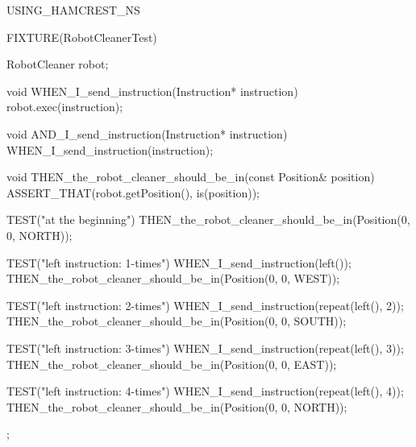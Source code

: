 \begin{content}
\begin{leftbar}
\begin{c++}[caption={test/robot-cleaner/RobotCleanerTest.cpp}]
USING_HAMCREST_NS

FIXTURE(RobotCleanerTest)
{
    RobotCleaner robot;

    void WHEN_I_send_instruction(Instruction* instruction)
    {
        robot.exec(instruction);
    }

    void AND_I_send_instruction(Instruction* instruction)
    {
        WHEN_I_send_instruction(instruction);
    }

    void THEN_the_robot_cleaner_should_be_in(const Position& position)
    {
        ASSERT_THAT(robot.getPosition(), is(position));
    }

    TEST("at the beginning")
    {
        THEN_the_robot_cleaner_should_be_in(Position(0, 0, NORTH));
    }

    TEST("left instruction: 1-times")
    {
        WHEN_I_send_instruction(left());
        THEN_the_robot_cleaner_should_be_in(Position(0, 0, WEST));
    }

    TEST("left instruction: 2-times")
    {
        WHEN_I_send_instruction(repeat(left(), 2));
        THEN_the_robot_cleaner_should_be_in(Position(0, 0, SOUTH));
    }

    TEST("left instruction: 3-times")
    {
        WHEN_I_send_instruction(repeat(left(), 3));
        THEN_the_robot_cleaner_should_be_in(Position(0, 0, EAST));
    }

    TEST("left instruction: 4-times")
    {
        WHEN_I_send_instruction(repeat(left(), 4));
        THEN_the_robot_cleaner_should_be_in(Position(0, 0, NORTH));
    }
};
\end{c++}
\end{leftbar}

\end{content}




